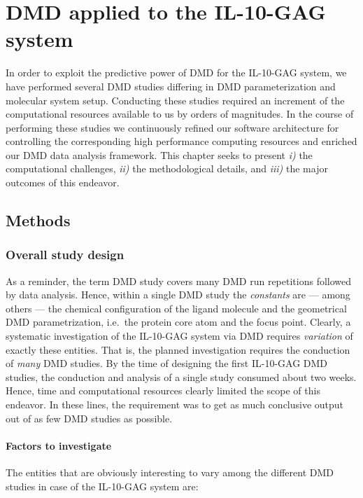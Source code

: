 \chapter{DMD applied to the IL-10-GAG system}

In order to exploit the predictive power of DMD for the IL-10-GAG system, we
have performed several DMD studies differing in DMD parameterization and
molecular system setup. Conducting these studies required an increment of the
computational resources available to us by orders of magnitudes. In the course
of performing these studies we continuously refined our software architecture
for controlling the corresponding high performance computing resources and
enriched our DMD data analysis framework. This chapter seeks to present
\textit{i)} the computational challenges, \textit{ii)} the methodological
details, and \textit{iii)} the major outcomes of this endeavor.


\section{Methods}

\subsection{Overall study design}
\label{dmdil10:overallmethod}

As a reminder, the term DMD study covers many DMD run repetitions followed by
data analysis. Hence, within a single DMD study the \textit{constants} are ---
among others --- the chemical configuration of the ligand molecule and the
geometrical DMD parametrization, i.e.\ the protein core atom and the focus
point. Clearly, a systematic investigation of the IL-10-GAG system via DMD
requires \textit{variation} of exactly these entities. That is, the planned
investigation requires the conduction of \textit{many} DMD studies. By the time
of designing the first IL-10-GAG DMD studies, the conduction and analysis of a
single study consumed about two weeks. Hence, time and computational resources
clearly limited the scope of this endeavor. In these lines, the requirement was
to get as much conclusive output out of as few DMD studies as possible.

\subsubsection{Factors to investigate}

The entities that are obviously interesting to vary among the different DMD
studies in case of the IL-10-GAG system are:

